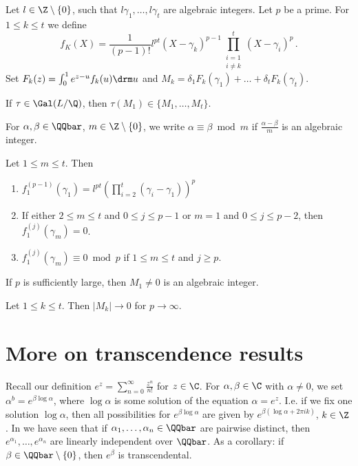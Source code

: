 Let \( l \in \Z \setminus \{0\} \), such that \( l \gamma_1, \dotsc, l \gamma_t \) are algebraic integers.
Let \( p \) be a prime.
For \( 1 \leq k \leq t \) we define
\[ f_K(X) = \frac{1}{(p-1)!} l^{pt} (X - \gamma_k)^{p-1} \prod_{\substack{i = 1\\i \neq k}}^{t} (X - \gamma_i)^p \,. \]
Set \( F_k(z) = \int_{0}^{1} e^{z-u} f_k(u) \drm u \) and \( M_k = \delta_1 F_k(\gamma_1) + \dots + \delta_t F_k(\gamma_t) \).

\begin{lem}
	If \( \tau \in \Gal(L/\Q) \), then \( \tau(M_1) \in \{M_1, \dotsc, M_t\} \).
\end{lem}

\begin{notat*}
	For \( \alpha, \beta \in \QQbar \), \( m \in \Z \setminus\{0\} \), we write \( \alpha \equiv \beta \bmod  m \) if \( \frac{\alpha-\beta}{m} \) is an algebraic integer.
\end{notat*}

\begin{lem}
	Let \( 1 \leq m \leq t \).
	Then
	\begin{enumerate}[label=(\roman*)]
		\item \( f_1^{(p-1)} (\gamma_1) = l^{pt} \left( \prod_{i=2}^{t} (\gamma_i - \gamma_1) \right)^p \)
		\item If either \( 2 \leq m \leq t \) and \( 0 \leq j \leq p-1 \) or \( m=1 \) and \( 0 \leq j \leq p-2 \), then \( f_1^{(j)} (\gamma_m) = 0 \).
		\item \( f_1^{(j)} (\gamma_m) \equiv 0 \bmod p \) if \( 1 \leq m \leq t \) and \( j \geq p \).
	\end{enumerate}
\end{lem}

\begin{lem}
	If \( p \) is sufficiently large, then \( M_1 \neq 0 \) is an algebraic integer.
\end{lem}

\begin{lem}
	Let \( 1 \leq k \leq t \).
	Then \( |M_k| \to 0 \) for \( p \to \infty \).
\end{lem}


\section{More on transcendence results}

Recall our definition \( e^z = \sum_{n=0}^{\infty} \frac{z^n}{n!} \) for \( z \in \C \).
For \( \alpha, \beta \in \C \) with \( \alpha \neq 0 \), we set \( \alpha^b = e^{\beta \log \alpha} \), where \( \log \alpha \) is some solution of the equation \( \alpha = e^z \).
I.e. if we fix one solution \( \log \alpha \), then all possibilities for \( e^{\beta \log \alpha} \) are given by \( e^{\beta(\log \alpha + 2\pi i k)} \), \( k \in \Z \).
In  we have seen that if \( \alpha_1, \dotsc, \alpha_n \in \QQbar \) are pairwise distinct, then \( e^{\alpha_1}, \dotsc, e^{\alpha_n} \) are linearly independent over \( \QQbar \).
As a corollary: if \( \beta \in \QQbar \setminus \{0\} \), then \( e^\beta \) is transcendental.

